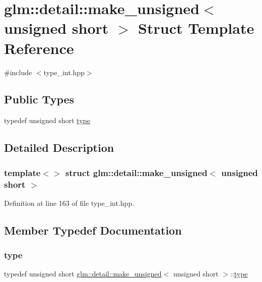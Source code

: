 \hypertarget{structglm_1_1detail_1_1make__unsigned_3_01unsigned_01short_01_4}{}\section{glm\+::detail\+::make\+\_\+unsigned$<$ unsigned short $>$ Struct Template Reference}
\label{structglm_1_1detail_1_1make__unsigned_3_01unsigned_01short_01_4}


{\ttfamily \#include $<$type\+\_\+int.\+hpp$>$}

\subsection*{Public Types}
\begin{DoxyCompactItemize}
\item 
typedef unsigned short \mbox{\hyperlink{structglm_1_1detail_1_1make__unsigned_3_01unsigned_01short_01_4_a42829000435f69c3a00675b6914f0d33}{type}}
\end{DoxyCompactItemize}


\subsection{Detailed Description}
\subsubsection*{template$<$$>$\newline
struct glm\+::detail\+::make\+\_\+unsigned$<$ unsigned short $>$}



Definition at line 163 of file type\+\_\+int.\+hpp.



\subsection{Member Typedef Documentation}
\mbox{\label{structglm_1_1detail_1_1make__unsigned_3_01unsigned_01short_01_4_a42829000435f69c3a00675b6914f0d33}} 
\subsubsection{\texorpdfstring{type}{type}}
{\footnotesize\ttfamily typedef unsigned short \mbox{\hyperlink{structglm_1_1detail_1_1make__unsigned}{glm\+::detail\+::make\+\_\+unsigned}}$<$ unsigned short $>$\+::\mbox{\hyperlink{structglm_1_1detail_1_1make__unsigned_3_01unsigned_01short_01_4_a42829000435f69c3a00675b6914f0d33}{type}}}



